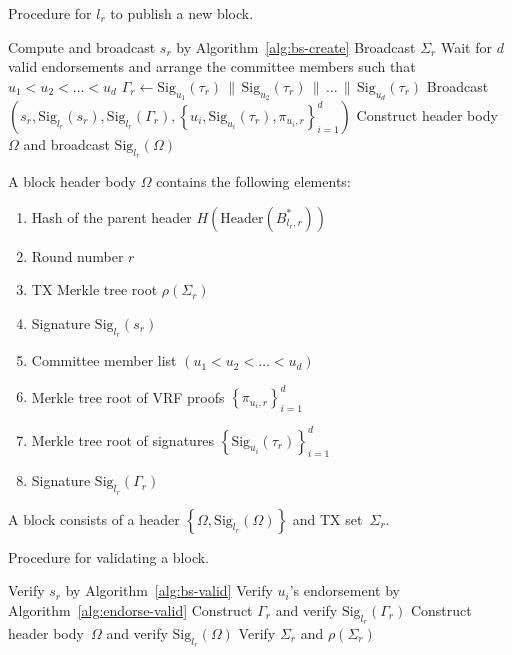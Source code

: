 \documentclass{article}
\begin{document}
\begin{algorithm}[H]
\caption{Procedure for $l_r$ to publish a new block.}
\label{alg:block-gen}
\begin{spacing}{1.2}
\begin{algorithmic}[1]
    \vspace{1ex}
    \State Compute and broadcast $s_r$ by Algorithm~\ref{alg:bs-create}
    \State Broadcast $\Sigma_r$
    \State Wait for $d$ valid endorsements and arrange the committee members such that $u_1<u_2<\dots<u_d$
    \State $\Gamma_r\leftarrow\textrm{Sig}_{u_1}(\tau_r)\,\|\,\textrm{Sig}_{u_2}(\tau_r)\,\|\,\dots\,\|\,\textrm{Sig}_{u_d}(\tau_r)$
    \State Broadcast $\left(s_r,\textrm{Sig}_{l_r}(s_r),\textrm{Sig}_{l_r}(\Gamma_r),
    \left\{u_i,\textrm{Sig}_{u_i}(\tau_r),\pi_{u_i,r}\right\}_{i=1}^d\right)$
    \State Construct header body~$\Omega$ and broadcast $\textrm{Sig}_{l_r}(\Omega)$
\end{algorithmic}
\end{spacing}
\end{algorithm}

A block header body $\Omega$ contains the following elements:
\begin{enumerate}
    \item Hash of the parent header $H\left(\textrm{Header}\left(B_{l_r,r}^*\right)\right)$ 
    \item Round number $r$
    \item TX Merkle tree root $\rho\left(\Sigma_r\right)$
    \item Signature $\textrm{Sig}_{l_r}(s_r)$
    \item Committee member list $\left(u_1<u_2<\dots<u_d\right)$
    \item Merkle tree root of VRF proofs $\left\{\pi_{u_i,r}\right\}_{i=1}^d$
    \item Merkle tree root of signatures $\left\{\textrm{Sig}_{u_i}(\tau_r)\right\}_{i=1}^d$
    \item Signature $\textrm{Sig}_{l_r}(\Gamma_r)$
\end{enumerate}

A block consists of a header $\left\{\Omega,\textrm{Sig}_{l_r}(\Omega)\right\}$ and TX set~$\Sigma_r$.

\begin{algorithm}[H]
\caption{Procedure for validating a block.}
\label{alg:block-valid}
\begin{spacing}{1.2}
\begin{algorithmic}[1]
    \vspace{1ex}
    \State Verify $s_r$ by Algorithm~\ref{alg:bs-valid}
        \State Verify $u_i$'s endorsement by Algorithm~\ref{alg:endorse-valid}
    \EndFor
    \State Construct $\Gamma_r$ and verify $\textrm{Sig}_{l_r}(\Gamma_r)$
    \State Construct header body~$\Omega$ and verify $\textrm{Sig}_{l_r}(\Omega)$
    \State Verify $\Sigma_r$ and $\rho\left(\Sigma_r\right)$ 
\end{algorithmic}
\end{spacing}
\end{algorithm}
\end{document}
